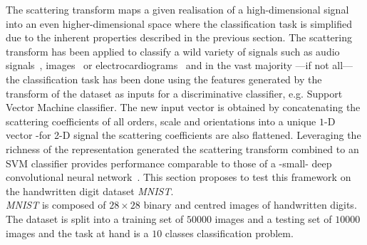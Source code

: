 \documentclass[a4paper,11pt]{report}
\begin{document}
    The scattering transform maps a given realisation of a high-dimensional signal into an even higher-dimensional space where the classification task is simplified due to the inherent properties described in the previous section. The scattering transform has been applied to classify a wild variety of signals such as audio signals~\citep{anden2011multiscale}, images~\citep{oyallon2014deep} or electrocardiograms~\citep{chudacek2014low} and in the vast majority ---if not all--- the classification task has been done using the features generated by the transform of the dataset as inputs for a discriminative classifier, e.g. Support Vector Machine classifier. The new input vector is obtained by concatenating the scattering coefficients of all orders, scale and orientations into a unique $1$-D vector -for 2-D signal the scattering coefficients are also flattened. Leveraging the richness of the representation generated the scattering transform combined to an SVM classifier provides performance comparable to those of a -small- deep convolutional neural network~\citep{oyallon2013generic}. This section proposes to test this framework on the handwritten digit dataset \textit{MNIST}.\\
    
    \textit{MNIST} is composed of $28 \times 28$ binary and centred images of handwritten digits. The dataset is split into a training set of $50000$ images and a testing set of $10000$ images and the task at hand is a $10$ classes classification problem.\\
    
\end{document}
